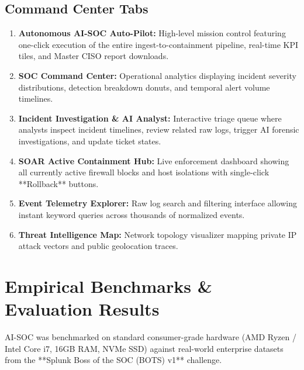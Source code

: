 \documentclass[11pt,a4paper]{article}
\begin{document}
\subsection{Command Center Tabs}
\begin{enumerate}
    \item \textbf{Autonomous AI-SOC Auto-Pilot:} High-level mission control featuring one-click execution of the entire ingest-to-containment pipeline, real-time KPI tiles, and Master CISO report downloads.
    \item \textbf{SOC Command Center:} Operational analytics displaying incident severity distributions, detection breakdown donuts, and temporal alert volume timelines.
    \item \textbf{Incident Investigation \& AI Analyst:} Interactive triage queue where analysts inspect incident timelines, review related raw logs, trigger AI forensic investigations, and update ticket states.
    \item \textbf{SOAR Active Containment Hub:} Live enforcement dashboard showing all currently active firewall blocks and host isolations with single-click **Rollback** buttons.
    \item \textbf{Event Telemetry Explorer:} Raw log search and filtering interface allowing instant keyword queries across thousands of normalized events.
    \item \textbf{Threat Intelligence Map:} Network topology visualizer mapping private IP attack vectors and public geolocation traces.
\end{enumerate}

\section{Empirical Benchmarks \& Evaluation Results}

AI-SOC was benchmarked on standard consumer-grade hardware (AMD Ryzen / Intel Core i7, 16GB RAM, NVMe SSD) against real-world enterprise datasets from the **Splunk Boss of the SOC (BOTS) v1** challenge.
\end{document}
